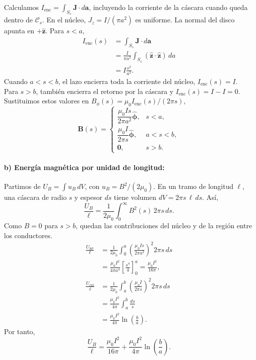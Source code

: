 \documentclass[11pt]{article}
\begin{document}
Calculamos $I_{\mathrm{enc}}=\int_{S_s}\mathbf J\cdot d\mathbf a$,
incluyendo la corriente de la cáscara cuando queda dentro de
$\mathcal C_s$. En el núcleo, $J_z=I/(\pi a^2)$ es uniforme.
La normal del disco apunta en $+\hat{\mathbf z}$. Para $s<a$,
\begin{align*}
    I_{\mathrm{enc}}(s)
    &=\int_{S_s}\mathbf J\cdot d\mathbf a\\
    &=\frac{I}{\pi a^2}\int_{S_s}
      (\hat{\mathbf z}\cdot\hat{\mathbf z})\,da\\
    &=I\frac{s^2}{a^2}.
\end{align*}
Cuando $a<s<b$, el lazo encierra toda la corriente del núcleo,
$I_{\mathrm{enc}}(s)=I$. Para $s>b$, también encierra el retorno
por la cáscara y $I_{\mathrm{enc}}(s)=I-I=0$. Sustituimos estos
valores en $B_\phi(s)=\mu_0 I_{\mathrm{enc}}(s)/(2\pi s)$,
\[
    \mathbf B(s)=
    \begin{cases}
      \dfrac{\mu_0 I s}{2\pi a^2}\hat{\boldsymbol\phi}, & s<a,\\[5pt]
      \dfrac{\mu_0 I}{2\pi s}\hat{\boldsymbol\phi}, & a<s<b,\\[5pt]
      \mathbf 0, & s>b.
    \end{cases}
\]
\paragraph{b) Energía magnética por unidad de longitud:}
Partimos de $U_B=\int u_B\,dV$, con $u_B=B^2/(2\mu_0)$.
En un tramo de longitud $\ell$, una cáscara de radio $s$ y
espesor $ds$ tiene volumen $dV=2\pi s\,\ell\,ds$. Así,
\[
    \frac{U_B}{\ell}
    =\frac{1}{2\mu_0}\int_0^\infty B^2(s)\,2\pi s\,ds.
\]
Como $B=0$ para $s>b$, quedan las contribuciones del núcleo
y de la región entre los conductores.
\begin{align*}
    \frac{U_{\mathrm{int}}}{\ell}
    &=\frac{1}{2\mu_0}\int_0^a
      \left(\frac{\mu_0 I s}{2\pi a^2}\right)^2 2\pi s\,ds\\
    &=\frac{\mu_0 I^2}{4\pi a^4}
      \left[\frac{s^4}{4}\right]_0^a
      =\frac{\mu_0 I^2}{16\pi},\\[3pt]
    \frac{U_{\mathrm{ext}}}{\ell}
    &=\frac{1}{2\mu_0}\int_a^b
      \left(\frac{\mu_0 I}{2\pi s}\right)^2 2\pi s\,ds\\
    &=\frac{\mu_0 I^2}{4\pi}\int_a^b\frac{ds}{s}\\
    &=\frac{\mu_0 I^2}{4\pi}\ln\!\left(\frac{b}{a}\right).
\end{align*}
Por tanto,
\[
    \frac{U_B}{\ell}
    =\frac{\mu_0 I^2}{16\pi}
     +\frac{\mu_0 I^2}{4\pi}\ln\!\left(\frac{b}{a}\right).
\]
\end{document}
